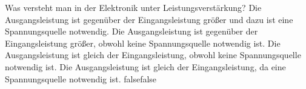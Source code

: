     {Was versteht man in der Elektronik unter Leistungsverstärkung?}
    {Die Ausgangsleistung ist gegenüber der Eingangsleistung größer und dazu ist eine Spannungsquelle notwendig.}
    {Die Ausgangsleistung ist gegenüber der Eingangsleistung größer, obwohl keine  Spannungsquelle notwendig ist.}
    {Die Ausgangsleistung ist gleich der Eingangsleistung, obwohl keine Spannungsquelle notwendig ist.}
    {Die Ausgangsleistung ist gleich der Eingangsleistung, da eine Spannungsquelle notwendig ist.}
    {false}{false}
